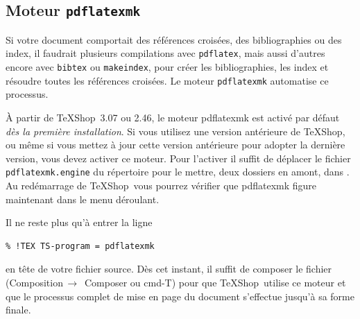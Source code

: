 \documentclass[11pt,french]{article}
\newcommand{\TS}{\textsf{\TeX Shop}}
\newcommand{\cmd}[1]{\textsf{#1}}
\newcommand{\mnu}[1]{\textsf{#1}}
\newcommand{\To}{\,\(\to\)\,}
\begin{document}
\subsection{Moteur \texttt{pdflatexmk}}

%

Si votre document comportait des références croisées, des bibliographies ou des index, il faudrait plusieurs compilations avec \texttt{pdflatex}, mais aussi d'autres encore avec \texttt{bibtex} ou \texttt{makeindex}, pour créer les bibliographies, les index et résoudre toutes les références croisées. Le moteur \texttt{pdflatexmk} automatise ce processus.


À partir de \TS\ 3.07 ou 2.46, le moteur pdflatexmk est activé par défaut \emph{dès la première installation}. Si vous utilisez une version antérieure de \TS, ou même si vous mettez à jour cette version antérieure pour adopter la dernière version, vous devez activer ce moteur. Pour l'activer il suffit de déplacer le fichier \texttt{pdflatexmk.engine} du répertoire  pour le mettre, deux dossiers en amont, dans . Au redémarrage de \TS\ vous pourrez vérifier que \cmd{pdflatexmk} figure maintenant dans le menu déroulant.

Il ne reste plus qu'à entrer la ligne
\begin{verbatim}
% !TEX TS-program = pdflatexmk
\end{verbatim}
en tête de votre fichier source. Dès cet instant, il suffit de composer le fichier (\mnu{Composition}\To{} \mnu{Composer} ou \cmd{cmd-T}) pour que \TS\ utilise ce moteur et que le processus complet de mise en page du document s'effectue jusqu'à sa forme finale. 
\end{document}
